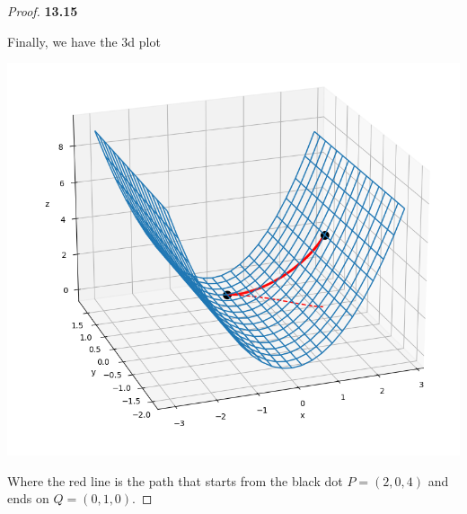 \documentclass[11pt]{article}
\theoremstyle{definition}
\begin{document}
\begin{proof}{\textbf{13.15}}
\begin{center}
    \end{center}
    Finally, we have the 3d plot 
    \begin{center}
        \includegraphics[scale=0.5]{ch13-15_2.png}
    \end{center}
    Where the red line is the path that starts from the black dot
    $P = (2, 0, 4)$ and ends on $Q = (0, 1, 0)$.
\end{proof}
\end{document}
